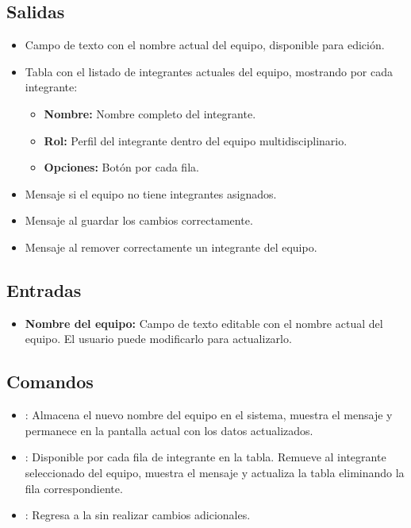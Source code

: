 
\subsection{Salidas}
\begin{itemize}
	\item Campo de texto con el nombre actual del equipo, disponible para edición.
	\item Tabla con el listado de integrantes actuales del equipo, mostrando por cada integrante:
	\begin{itemize}
		\item \textbf{Nombre:} Nombre completo del integrante.
		\item \textbf{Rol:} Perfil del integrante dentro del equipo multidisciplinario.
		\item \textbf{Opciones:} Botón  por cada fila.
	\end{itemize}
	\item Mensaje  si el equipo no tiene integrantes asignados.
	\item Mensaje  al guardar los cambios correctamente.
	\item Mensaje  al remover correctamente un integrante del equipo.
\end{itemize}

\subsection{Entradas}
\begin{itemize}
	\item \textbf{Nombre del equipo:} Campo de texto editable con el nombre actual del equipo. El usuario puede modificarlo para actualizarlo.
\end{itemize}

\subsection{Comandos}
\begin{itemize}
	\item {}: Almacena el nuevo nombre del equipo en el sistema, muestra el mensaje  y permanece en la pantalla actual con los datos actualizados.
	\item {}: Disponible por cada fila de integrante en la tabla. Remueve al integrante seleccionado del equipo, muestra el mensaje  y actualiza la tabla eliminando la fila correspondiente.
	\item {}: Regresa a la  sin realizar cambios adicionales.
\end{itemize}


